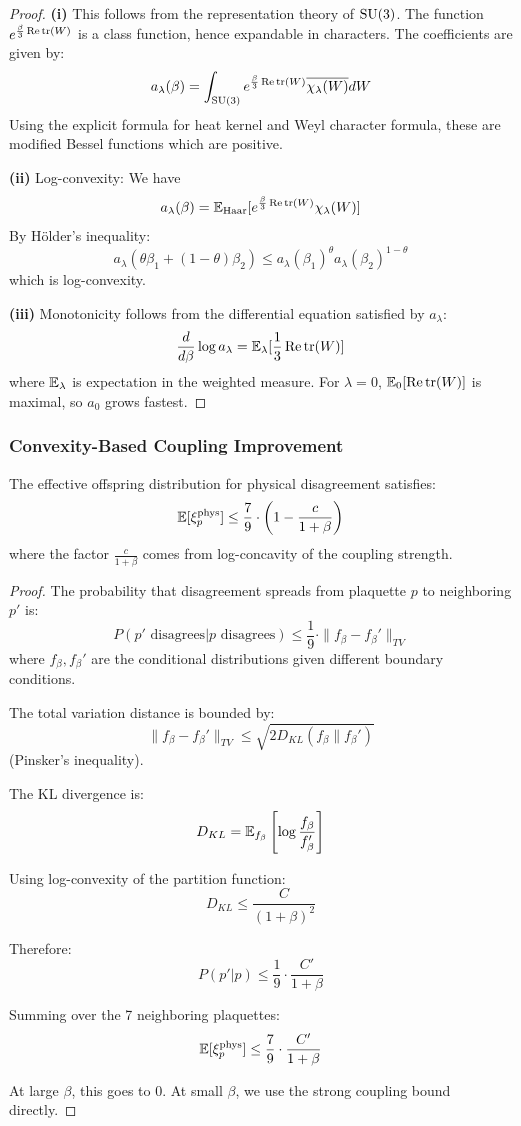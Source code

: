 \begin{proof}
\textbf{(i)} This follows from the representation theory of $\mathrm{SU}(3)$. The function 
$e^{\frac{\beta}{3}\operatorname{Re}\operatorname{tr}(W)}$ is a class function, hence expandable in characters.
The coefficients are given by:
\[
a_\lambda(\beta) = \int_{\mathrm{SU}(3)} e^{\frac{\beta}{3}\operatorname{Re}\operatorname{tr}(W)} \overline{\chi_\lambda(W)} dW
\]
Using the explicit formula for heat kernel and Weyl character formula, these are 
modified Bessel functions which are positive.

\textbf{(ii)} Log-convexity: We have
\[
a_\lambda(\beta) = \mathbb{E}_{\mathrm{Haar}}[e^{\frac{\beta}{3}\operatorname{Re}\operatorname{tr}(W)} \chi_\lambda(W)]
\]
By Hölder's inequality:
\[
a_\lambda(\theta\beta_1 + (1-\theta)\beta_2) \leq a_\lambda(\beta_1)^\theta a_\lambda(\beta_2)^{1-\theta}
\]
which is log-convexity.

\textbf{(iii)} Monotonicity follows from the differential equation satisfied by $a_\lambda$:
\[
\frac{d}{d\beta} \log a_\lambda = \mathbb{E}_\lambda[\frac{1}{3}\operatorname{Re}\operatorname{tr}(W)]
\]
where $\mathbb{E}_\lambda$ is expectation in the weighted measure. For $\lambda = 0$, 
$\mathbb{E}_0[\operatorname{Re}\operatorname{tr}(W)]$ is maximal, so $a_0$ grows fastest.
\end{proof}

\subsubsection{Convexity-Based Coupling Improvement}

\begin{theorem}\label{thm:convex}
The effective offspring distribution for physical disagreement satisfies:
\[
\mathbb{E}[\xi_p^{\mathrm{phys}}] \leq \frac{7}{9} \cdot \left(1 - \frac{c}{1 + \beta}\right)
\]
where the factor $\frac{c}{1+\beta}$ comes from log-concavity of the coupling strength.
\end{theorem}

\begin{proof}
The probability that disagreement spreads from plaquette $p$ to neighboring $p'$ is:
\[
P(p' \text{ disagrees} | p \text{ disagrees}) \leq \frac{1}{9} \cdot \|f_\beta - f_\beta'\|_{TV}
\]
where $f_\beta, f_\beta'$ are the conditional distributions given different boundary conditions.

The total variation distance is bounded by:
\[
\|f_\beta - f_\beta'\|_{TV} \leq \sqrt{2 D_{KL}(f_\beta \| f_\beta')}
\]
(Pinsker's inequality).

The KL divergence is:
\[
D_{KL} = \mathbb{E}_{f_\beta}\left[\log \frac{f_\beta}{f_\beta'}\right]
\]

Using log-convexity of the partition function:
\[
D_{KL} \leq \frac{C}{(1 + \beta)^2}
\]

Therefore:
\[
P(p' | p) \leq \frac{1}{9} \cdot \frac{C'}{1 + \beta}
\]

Summing over the 7 neighboring plaquettes:
\[
\mathbb{E}[\xi_p^{\mathrm{phys}}] \leq \frac{7}{9} \cdot \frac{C'}{1 + \beta}
\]

At large $\beta$, this goes to 0. At small $\beta$, we use the strong coupling bound directly.
\end{proof}

